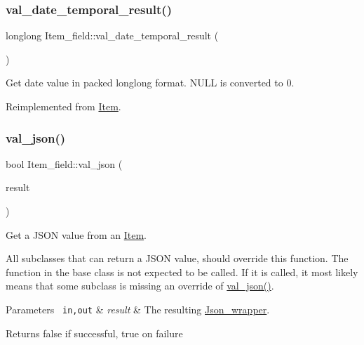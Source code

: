 \subsubsection{\texorpdfstring{val\+\_\+date\+\_\+temporal\+\_\+result()}{val\_date\_temporal\_result()}}
{\footnotesize\ttfamily longlong Item\+\_\+field\+::val\+\_\+date\+\_\+temporal\+\_\+result (\begin{DoxyParamCaption}{ }\end{DoxyParamCaption})\hspace{0.3cm}{\ttfamily [virtual]}}

Get date value in packed longlong format. N\+U\+LL is converted to 0. 

Reimplemented from \mbox{\hyperlink{classItem_aa66204e63dc471de5be79e2da81ac7aa}{Item}}.

\mbox{\label{classItem__field_a9ec27408794eda03a2f7a979dfa5cf57}} 
\subsubsection{\texorpdfstring{val\+\_\+json()}{val\_json()}}
{\footnotesize\ttfamily bool Item\+\_\+field\+::val\+\_\+json (\begin{DoxyParamCaption}\item[{\mbox{\hyperlink{classJson__wrapper}{Json\+\_\+wrapper}} $\ast$}]{result }\end{DoxyParamCaption})\hspace{0.3cm}{\ttfamily [virtual]}}

Get a J\+S\+ON value from an \mbox{\hyperlink{classItem}{Item}}.

All subclasses that can return a J\+S\+ON value, should override this function. The function in the base class is not expected to be called. If it is called, it most likely means that some subclass is missing an override of \mbox{\hyperlink{classItem__field_a9ec27408794eda03a2f7a979dfa5cf57}{val\+\_\+json()}}.


\begin{DoxyParams}[1]{Parameters}
\mbox{\texttt{ in,out}}  & {\em result} & The resulting \mbox{\hyperlink{classJson__wrapper}{Json\+\_\+wrapper}}.\\
\hline
\end{DoxyParams}
\begin{DoxyReturn}{Returns}
false if successful, true on failure 
\end{DoxyReturn}


